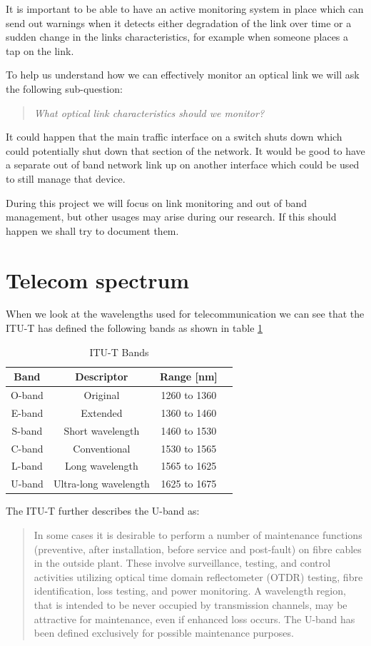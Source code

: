 \documentclass{article}
\begin{document}
It is important to be able to have an active monitoring system in place which can send out warnings when it detects either degradation of the link over time or a sudden change in the links characteristics, for example when someone places a tap on the link. 

To help us understand how we can effectively monitor an optical link we will ask the following sub-question:
\begin{quote}
\textit{
What optical link characteristics should we monitor?
}
\end{quote}

It could happen that the main traffic interface on a switch shuts down which could potentially shut down that section of the network.
It would be good to have a separate out of band network link up on another interface which could be used to still manage that device.

During this project we will focus on link monitoring and out of band management, but other usages may arise during our research.
If this should happen we shall try to document them.

\newpage
\section{Telecom spectrum}
When we look at the wavelengths used for telecommunication we can see that the ITU-T has defined the following bands as shown in table \ref{tab:bands}
\begin{table}[h]
\centering
\label{tab:bands}
\begin{tabular}{|c|c|c|c|}
\hline 
\textbf{Band} & \textbf{Descriptor} & \textbf{Range [nm]}\\ 
\hline 
O-band & Original & 1260 to 1360 \\ 
\hline 
E-band & Extended & 1360 to 1460 \\ 
\hline 
S-band & Short wavelength & 1460 to 1530 \\ 
\hline 
C-band & Conventional & 1530 to 1565 \\ 
\hline 
L-band & Long wavelength & 1565 to 1625 \\ 
\hline 
U-band & Ultra-long wavelength & 1625 to 1675 \\ 
\hline 
\end{tabular} 
\caption{ITU-T Bands\cite[p. 134]{itu-t:manual2009}
}
\end{table}

The ITU-T further describes the U-band as:
\begin{quote}
In some cases it is desirable to perform a number of maintenance functions (preventive, after
installation, before service and post-fault) on fibre cables in the outside plant. These involve
surveillance, testing, and control activities utilizing optical time domain reflectometer (OTDR)
testing, fibre identification, loss testing, and power monitoring. A wavelength region, that is
intended to be never occupied by transmission channels, may be attractive for maintenance,
even if enhanced loss occurs. The U-band has been defined exclusively for possible
maintenance purposes.
\end{quote}
\end{document}
